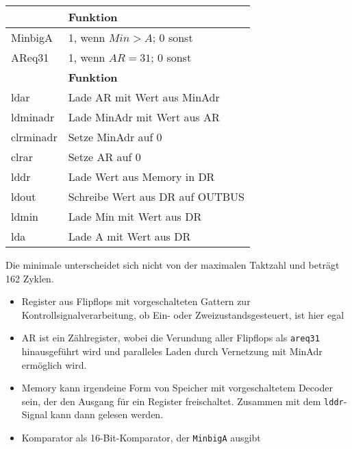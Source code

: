 \documentclass{CInf_practice}
\begin{document}
\begin{center}
   \begin{tabularx}{.8\textwidth}{|L|X|}
      \hline
       & \textbf{Funktion} \\ \hline
      MinbigA   & 1, wenn $Min > A$; 0 sonst \\
      AReq31    & 1, wenn $AR=31$; 0 sonst \\ \hline
      \hline
       & \textbf{Funktion} \\ \hline
      ldar                                  & Lade AR mit Wert aus MinAdr\\
      ldminadr                              & Lade MinAdr mit Wert aus AR\\
      clrminadr                             & Setze MinAdr auf 0\\
      clrar                                 & Setze AR auf 0\\
      lddr                                  & Lade Wert aus Memory in DR\\
      ldout                                 & Schreibe Wert aus DR auf OUTBUS\\
      ldmin                                 & Lade Min mit Wert aus DR\\
      lda                                   & Lade A mit Wert aus DR\\
      \hline
   \end{tabularx}
\end{center}



Die minimale unterscheidet sich nicht von der maximalen Taktzahl und beträgt 162
Zyklen.


\begin{itemize}
   \item Register aus Flipflops mit vorgeschalteten Gattern zur
      Kontrollsignalverarbeitung, ob Ein- oder Zweizustandsgesteuert, ist hier
      egal
   \item AR ist ein Zählregister, wobei die Verundung aller Flipflops als
      \texttt{areq31} hinausgeführt wird und paralleles Laden durch Vernetzung
      mit MinAdr ermöglich wird.
   \item Memory kann irgendeine Form von Speicher mit vorgeschaltetem Decoder
      sein, der den Ausgang für ein Register freischaltet. Zusammen mit dem
      \texttt{lddr}-Signal kann dann gelesen werden.
   \item Komparator als 16-Bit-Komparator, der \texttt{MinbigA} ausgibt
\end{itemize}
\end{document}
